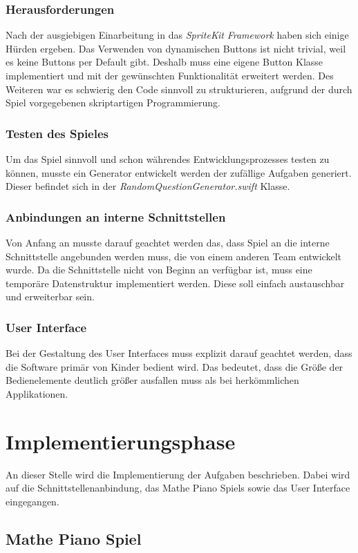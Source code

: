 \subsubsection{Herausforderungen}
Nach der ausgiebigen Einarbeitung in das \textit{SpriteKit} \textit{Framework} haben sich einige Hürden ergeben. Das Verwenden von dynamischen Buttons ist nicht trivial, weil es keine Buttons per Default gibt. Deshalb muss eine eigene Button Klasse implementiert und mit der gewünschten Funktionalität erweitert werden. Des Weiteren war es schwierig den Code sinnvoll zu strukturieren, aufgrund der durch Spiel vorgegebenen skriptartigen Programmierung. %
\subsubsection{Testen des Spieles}
Um das Spiel sinnvoll und schon währendes Entwicklungsprozesses testen zu können, musste ein Generator entwickelt werden der zufällige Aufgaben generiert. Dieser befindet sich in der \textit{RandomQuestionGenerator.swift} Klasse. 
\subsubsection{Anbindungen an interne Schnittstellen}
Von Anfang an musste darauf geachtet werden das, dass Spiel an die interne Schnittstelle angebunden werden muss, die von einem anderen Team entwickelt wurde. Da die Schnittstelle nicht von Beginn an verfügbar ist, muss eine temporäre Datenstruktur implementiert werden. Diese soll einfach austauschbar und erweiterbar sein.
\subsubsection{User Interface}
Bei der Gestaltung des User Interfaces muss explizit darauf geachtet werden, dass die Software primär von Kinder bedient wird. Das bedeutet, dass die Größe der Bedienelemente deutlich größer ausfallen muss als bei herkömmlichen Applikationen.   

\section{Implementierungsphase}
An dieser Stelle wird die Implementierung der Aufgaben beschrieben. Dabei wird auf die Schnittstellenanbindung, das Mathe Piano Spiels sowie das User Interface eingegangen.
\subsection{Mathe Piano Spiel}

